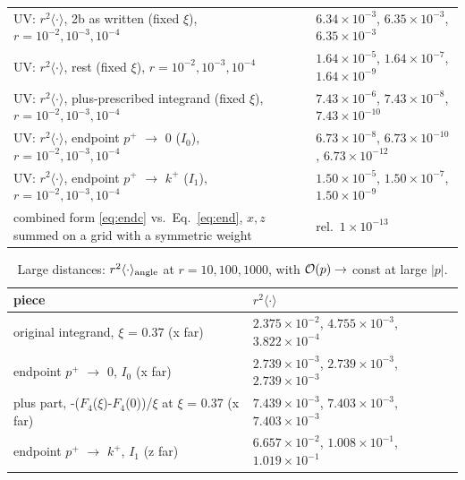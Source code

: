 \documentclass[10pt]{article}
\begin{document}
\begin{center}
\begin{longtable}{@{}p{}p{}@{}}
UV: $r^2\langle\cdot\rangle$, 2b as written (fixed $\xi$), $r=10^{-2},10^{-3},10^{-4}$ & $6.34\times10^{-3}$, $6.35\times10^{-3}$, $6.35\times10^{-3}$\\
UV: $r^2\langle\cdot\rangle$, rest (fixed $\xi$), $r=10^{-2},10^{-3},10^{-4}$ & $1.64\times10^{-5}$, $1.64\times10^{-7}$, $1.64\times10^{-9}$\\
UV: $r^2\langle\cdot\rangle$, plus-prescribed integrand (fixed $\xi$), $r=10^{-2},10^{-3},10^{-4}$ & $7.43\times10^{-6}$, $7.43\times10^{-8}$, $7.43\times10^{-10}$\\
UV: $r^2\langle\cdot\rangle$, endpoint $p^+$ $\to$ 0 ($I_0$), $r=10^{-2},10^{-3},10^{-4}$ & $6.73\times10^{-8}$, $6.73\times10^{-10}$, $6.73\times10^{-12}$\\
UV: $r^2\langle\cdot\rangle$, endpoint $p^+$ $\to$ $k^+$ ($I_1$), $r=10^{-2},10^{-3},10^{-4}$ & $1.50\times10^{-5}$, $1.50\times10^{-7}$, $1.50\times10^{-9}$\\
combined form \eqref{eq:endc} vs.\ Eq.~\eqref{eq:end}, $x,z$ summed on a grid with a symmetric weight & rel.\ $1\times10^{-13}$\\
\bottomrule
\end{longtable}
\begin{longtable}{@{}p{}p{}@{}}
\caption{Large distances: $r^2\langle\cdot\rangle_{\rm angle}$ at $r=10,100,1000$, with ${\cal O}(p)\to$ const at large $|p|$.}\label{tab:ir}\\
\toprule
piece & $r^2\langle\cdot\rangle$\\\midrule
original integrand, $\xi$ = 0.37 (x far) & $2.375\times10^{-2}$, $4.755\times10^{-3}$, $3.822\times10^{-4}$\\
endpoint $p^+$ $\to$ 0, $I_0$ (x far) & $2.739\times10^{-3}$, $2.739\times10^{-3}$, $2.739\times10^{-3}$\\
plus part, -($F_4$($\xi$)-$F_4$(0))/$\xi$ at $\xi$ = 0.37 (x far) & $7.439\times10^{-3}$, $7.403\times10^{-3}$, $7.403\times10^{-3}$\\
endpoint $p^+$ $\to$ $k^+$, $I_1$ (z far) & $6.657\times10^{-2}$, $1.008\times10^{-1}$, $1.019\times10^{-1}$\\
\bottomrule
\end{longtable}
\end{center}
\end{document}
